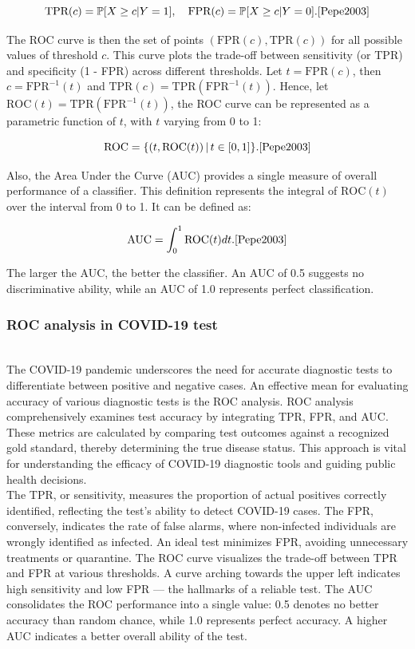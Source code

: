 \documentclass{article}\usepackage[]{graphicx}\usepackage[]{xcolor}
\numberwithin{equation}{section}
\begin{document}
\[ \text{TPR}(c) = \mathbb{P}[X \geq c | Y = 1], \quad \text{FPR}(c) = \mathbb{P}[X \geq c | Y = 0].\cite{Pepe2003}\]

\noindent
The ROC curve is then the set of points $(\text{FPR}(c), \text{TPR}(c))$ for all possible values of threshold $c$. This curve plots the trade-off between sensitivity (or TPR) and specificity (1 - FPR) across different thresholds. Let $t=\text{FPR}(c)$, then $c = \text{FPR}^{-1}(t)$ and $\text{TPR}(c)= \text{TPR}(\text{FPR}^{-1}(t))$. Hence, let $\text{ROC}(t)= \text{TPR}(\text{FPR}^{-1}(t))$, the ROC curve can be represented as a parametric function of $t$, with $t$ varying from 0 to 1:

\[ \text{ROC} = \{ (t, \text{ROC}(t)) \,|\, t \in [0, 1] \}.\cite{Pepe2003} \]

\noindent
Also, the Area Under the Curve (AUC) provides a single measure of overall performance of a classifier. This definition represents the integral of $\text{ROC}(t)$ over the interval from 0 to 1. It can be defined as:

\[ \text{AUC} = \int_{0}^{1} \text{ROC}(t) dt.\cite{Pepe2003} \]

\noindent
The larger the AUC, the better the classifier. An AUC of 0.5 suggests no discriminative ability, while an AUC of 1.0 represents perfect classification.\\

\noindent 
\subsubsection{ROC analysis in COVID-19 test}\\
The COVID-19 pandemic underscores the need for accurate diagnostic tests to differentiate between positive and negative cases\cite{Garcia2021ROCAlly}. An effective mean for evaluating accuracy of various diagnostic tests is the ROC analysis. ROC analysis comprehensively examines test accuracy by integrating TPR, FPR, and AUC. These metrics are calculated by comparing test outcomes against a recognized gold standard, thereby determining the true disease status. This approach is vital for understanding the efficacy of COVID-19 diagnostic tools and guiding public health decisions.\\

\noindent
The TPR, or sensitivity, measures the proportion of actual positives correctly identified, reflecting the test's ability to detect COVID-19 cases. The FPR, conversely, indicates the rate of false alarms, where non-infected individuals are wrongly identified as infected. An ideal test minimizes FPR, avoiding unnecessary treatments or quarantine. The ROC curve visualizes the trade-off between TPR and FPR at various thresholds. A curve arching towards the upper left indicates high sensitivity and low FPR — the hallmarks of a reliable test. The AUC consolidates the ROC performance into a single value: 0.5 denotes no better accuracy than random chance, while 1.0 represents perfect accuracy. A higher AUC indicates a better overall ability of the test.\\
\end{document}
